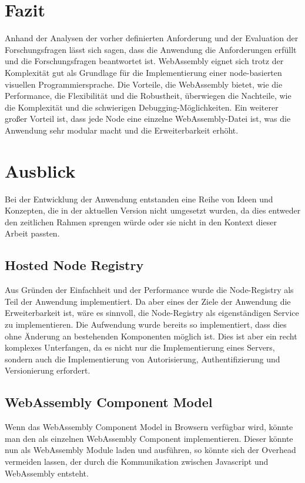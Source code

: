 \documentclass[ngerman]{article}
\begin{document}
\section{Fazit}
Anhand der Analysen der vorher definierten Anforderung und der Evaluation der Forschungsfragen lässt sich sagen, dass die Anwendung die Anforderungen erfüllt und die Forschungsfragen beantwortet ist.
\br
WebAssembly eignet sich trotz der Komplexität gut als Grundlage für die Implementierung einer node-basierten visuellen Programmiersprache. Die Vorteile, die WebAssembly bietet, wie die Performance, die Flexibilität und die Robustheit, überwiegen die Nachteile, wie die Komplexität und die schwierigen Debugging-Möglichkeiten. Ein weiterer großer Vorteil ist, dass jede Node eine einzelne WebAssembly-Datei ist, was die Anwendung sehr modular macht und die Erweiterbarkeit erhöht.

\section{Ausblick}
Bei der Entwicklung der Anwendung entstanden eine Reihe von Ideen und Konzepten, die in der aktuellen Version nicht umgesetzt wurden, da 
dies entweder den zeitlichen Rahmen sprengen würde oder sie nicht in den Kontext dieser Arbeit passten.

\subsection*{Hosted Node Registry}
Aus Gründen der Einfachheit und der Performance wurde die Node-Registry als Teil der Anwendung implementiert. Da aber eines der Ziele der Anwendung die Erweiterbarkeit ist, wäre es sinnvoll, die Node-Registry als eigenständigen Service zu implementieren. Die Aufwendung wurde bereits so implementiert, dass dies ohne Änderung an bestehenden Komponenten möglich ist.
\br
Dies ist aber ein recht komplexes Unterfangen, da es nicht nur die Implementierung eines Servers, sondern auch die Implementierung von Autorisierung, Authentifizierung und Versionierung erfordert.

\subsection*{WebAssembly Component Model}
Wenn das WebAssembly Component Model in Browsern verfügbar wird, könnte man den  als einzelnen WebAssembly Component implementieren. Dieser könnte nun  als WebAssembly Module laden und ausführen, so könnte sich der Overhead vermeiden lassen, der durch die Kommunikation zwischen Javascript und WebAssembly entsteht.
\end{document}
